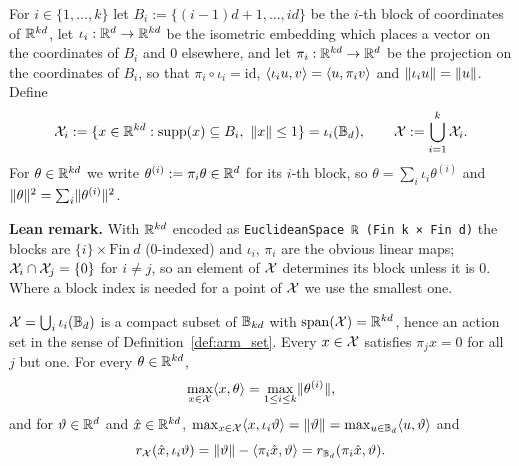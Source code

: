 \begin{definition}\label{def:block_ball_set}
\leanok
{}
For $i \in \{1,\dots,k\}$ let $B_i := \{(i-1)d + 1, \dots, id\}$ be the $i$-th block of
coordinates of $\mathbb{R}^{kd}$, let $\iota_i : \mathbb{R}^d \to \mathbb{R}^{kd}$ be the isometric embedding which
places a vector on the coordinates of $B_i$ and $0$ elsewhere, and let
$\pi_i : \mathbb{R}^{kd} \to \mathbb{R}^d$ be the projection on the coordinates of $B_i$, so that
$\pi_i\circ\iota_i = \mathrm{id}$, $\langle \iota_i u, v \rangle = \langle u, \pi_i v \rangle$ and
$\lVert \iota_i u \rVert = \lVert u \rVert$. Define
\[
  \mathcal{X}_i := \{ x \in \mathbb{R}^{kd} : \operatorname{supp}(x) \subseteq B_i,\ \lVert x \rVert \le 1 \} = \iota_i(\mathbb{B}_d),
  \qquad
  \mathcal{X} := \bigcup_{i=1}^k \mathcal{X}_i .
\]
For $\theta \in \mathbb{R}^{kd}$ we write $\theta^{(i)} := \pi_i\theta \in \mathbb{R}^d$ for its $i$-th block,
so $\theta = \sum_i\iota_i\theta^{(i)}$ and $\lVert \theta \rVert^2 = \sum_i\lVert \theta^{(i)} \rVert^2$.
\end{definition}

\textbf{Lean remark.} With $\mathbb{R}^{kd}$ encoded as \texttt{EuclideanSpace ℝ (Fin k × Fin d)}
the blocks are $\{i\}\times\mathrm{Fin}\ d$ (0-indexed) and $\iota_i$, $\pi_i$ are the
obvious linear maps; $\mathcal{X}_i \cap \mathcal{X}_j = \{0\}$ for $i \ne j$, so an element of $\mathcal{X}$
determines its block unless it is $0$. Where a block index is needed for a point of $\mathcal{X}$
we use the smallest one.

\begin{lemma}\label{lem:block_ball_basic}
\leanok
{}
$\mathcal{X} = \bigcup_i\iota_i(\mathbb{B}_d)$ is a compact subset of $\mathbb{B}_{kd}$ with $\operatorname{span}(\mathcal{X}) = \mathbb{R}^{kd}$,
hence an action set in the sense of Definition~\ref{def:arm_set}. Every $x \in \mathcal{X}$ satisfies
$\pi_j x = 0$ for all $j$ but one. For every $\theta \in \mathbb{R}^{kd}$,
\[
  \max_{x \in \mathcal{X}}\langle x, \theta \rangle = \max_{1\le i\le k}\lVert \theta^{(i)} \rVert,
\]
and for $\vartheta \in \mathbb{R}^d$ and $\hat{x} \in \mathbb{R}^{kd}$,
$\max_{x\in\mathcal{X}}\langle x, \iota_i\vartheta \rangle = \lVert \vartheta \rVert = \max_{u \in \mathbb{B}_d}\langle u, \vartheta \rangle$
and
\[
  r_{\mathcal{X}}(\hat{x}, \iota_i\vartheta) = \lVert \vartheta \rVert - \langle \pi_i\hat{x}, \vartheta \rangle
  = r_{\mathbb{B}_d}(\pi_i\hat{x}, \vartheta) .
\]
\end{lemma}

